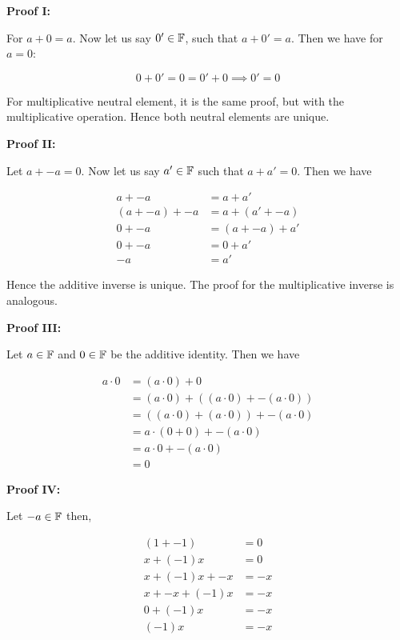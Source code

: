 \textbf{Proof I:}

For \(a + 0 = a\). Now let us say \(0' \in \mathbb{F}\), such that \(a + 0' = a\). Then we have for \(a = 0\):

\[
	0 + 0' = 0 = 0' + 0 \implies 0' = 0
\]

For multiplicative neutral element, it is the same proof, but with the multiplicative operation. Hence
both neutral elements are unique.

\QED

\textbf{Proof II:}

Let \(a + -a = 0\). Now let us say \(a' \in \mathbb{F}\) such that \(a + a' = 0\). Then we have

\begin{align*}
	a + -a        & = a + a'        \\
	(a + -a) + -a & = a + (a' + -a) \\
	0 + -a        & = (a + -a) + a' \\
	0 + -a        & = 0 + a'        \\
	-a            & = a'
\end{align*}

Hence the additive inverse is unique. The proof for the multiplicative inverse is analogous.

\QED

\textbf{Proof III:}

Let \(a \in \mathbb{F}\) and \(0 \in \mathbb{F}\) be the additive identity. Then we have

\begin{align*}
	a \cdot 0 & = (a \cdot 0) + 0                             \\
	          & = (a \cdot 0) + ((a \cdot 0) + - (a \cdot 0)) \\
	          & = ((a \cdot 0) + (a \cdot 0)) + - (a \cdot 0) \\
	          & = a \cdot(0 + 0) + - (a \cdot 0)              \\
	          & = a \cdot 0 + - (a \cdot 0)                   \\
	          & = 0
\end{align*}

\QED

\textbf{Proof IV:}

Let \(-a \in \mathbb{F}\) then,

\begin{align*}
	(1 + -1)       & = 0  \\
	x + (-1)x      & = 0  \\
	x + (-1)x + -x & = -x \\
	x + -x + (-1)x & = -x \\
	0 + (-1)x      & = -x \\
	(-1)x          & = -x
\end{align*}

